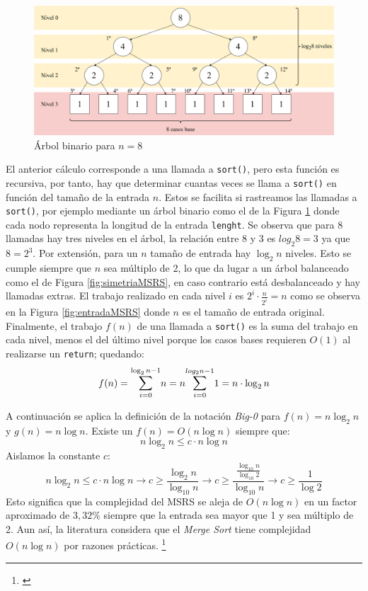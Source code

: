 \documentclass[titlepage]{article}
\begin{document}
\begin{figure}[hbtp]
    \centering
    \includegraphics[width=0.8\linewidth]{Diagrames/arbolBinarioMSRSn8.png}
    \caption{Árbol binario para \(n=8\)}
    \label{fig:arbol-MSRS-N=8}
\end{figure}

El anterior cálculo corresponde a una llamada a \lstinline|sort()|, pero esta función es recursiva, por tanto, hay que determinar cuantas veces se llama a \lstinline|sort()| en función del tamaño de la entrada \(n\). Estos se facilita si rastreamos las llamadas a \lstinline|sort()|, por ejemplo mediante un árbol binario como el de la Figura \ref{fig:arbol-MSRS-N=8} donde cada nodo representa la longitud de la entrada \lstinline|lenght|. Se observa que para 8 llamadas hay tres niveles en el árbol, la relación entre 8 y 3 es \(log_{2}{8} = 3\) ya que \(8=2^3\). Por extensión, para un \(n\) tamaño de entrada hay \(\log_{2}{n}\) niveles. Esto se cumple siempre que \(n\) sea múltiplo de 2, lo que da lugar a un árbol balanceado como el de Figura \ref{fig:simetriaMSRS}, en caso contrario está desbalanceado y hay llamadas extras. El trabajo realizado en cada nivel \(i\) es \(2^i\cdot \frac{n}{2^i} = n\) como se observa en la Figura \ref{fig:entradaMSRS} donde \(n\) es el tamaño de entrada original. Finalmente, el trabajo \(f(n)\) de una llamada a \lstinline|sort()| es la suma del trabajo en cada nivel, menos el del último nivel porque los casos bases requieren \(O(1)\) al realizarse un \lstinline|return|; quedando:
\[
	f(n) = \mathlarger{\sum}_{i=0}^{\log_{2}{n} -1} {n} = n\mathlarger{\sum}_{i=0}^{log_{2}{n} -1} {1} = n\cdot\log_{2}{n}
\]

A continuación se aplica la definición de la notación \textit{Big-0} para \(f(n)=n\log_{2}{n}\) y \(g(n)=n\log{n}\). Existe un \(f(n)=O(n\log{n})\) siempre que: 
\[n\log_{2}{n} \leq c\cdot n\log{n}\]
Aislamos la constante \(c\):
\[
	n\log_{2}{n} \leq c\cdot n\log{n} \longrightarrow c \geq \frac{\log_{2}{n}} {\log_{10}{n}} \longrightarrow c \geq \frac{ \frac{\log_{10}{n}} {\log_{10}{2}} } {\log_{10}{n}} \longrightarrow c \geq \frac{1}{\log{2}} 
\]
Esto significa que la complejidad del MSRS se aleja de \(O(n\log{n})\) en un factor aproximado de \(3,32\%\) siempre que la entrada sea mayor que 1 y sea múltiplo de 2. Aun así, la literatura considera que el \textit{Merge Sort} tiene complejidad \(O(n\log{n})\) por razones prácticas. \footnote{\cite{Sedgewick2003-cd}}
\end{document}
